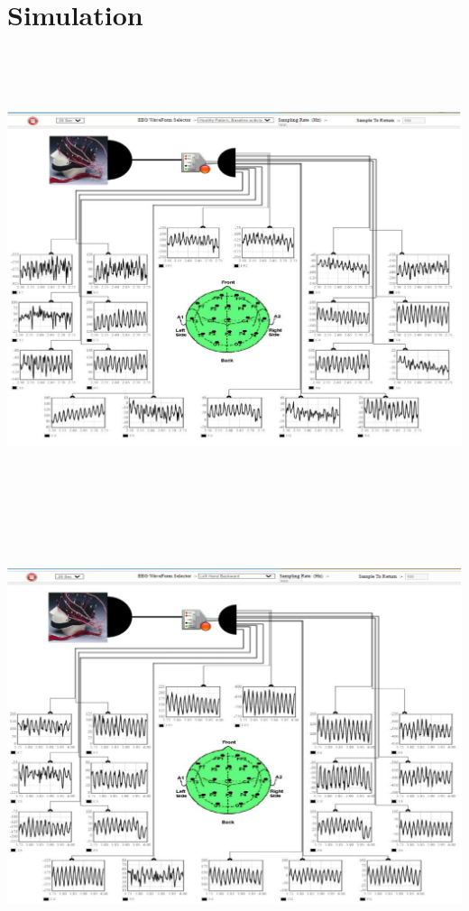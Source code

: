 \documentclass[
  11pt,
  letterpaper,
  DIV=11,
  numbers=noendperiod]{scrreprt}
\begin{document}
\section{Simulation}\label{simulation-1}

\begin{center}
\includegraphics[width=5.6875in,height=5.28125in]{images/clipboard-2845690509.png}
\end{center}

\begin{center}
\includegraphics[width=5.66667in,height=4.89583in]{images/clipboard-8096195.png}
\end{center}
\end{document}
